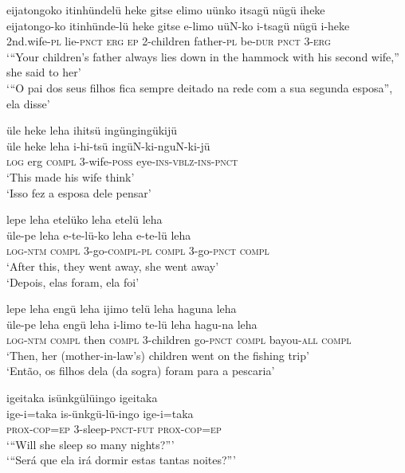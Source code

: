 \documentclass[output=paper,
modfonts,nonflat
]{langsci/langscibook}
\begin{document}
\ea eijatongoko itinhündelü heke gitse elimo uünko itsagü nügü iheke \\[.3em]
\gll eijatongo-ko	itinhünde-lü	heke	gitse	e-limo		uüN-ko i-tsagü	nügü i-heke \\
2nd.wife-\textsc{pl}	lie-\textsc{pnct}	\textsc{erg} 	\textsc{ep} 	2-children 	father-\textsc{pl} be-\textsc{dur} 	\textsc{pnct} 3-\textsc{erg} \\
\glt ‘“Your children’s father always lies down in the hammock with his second wife,” she said to her’ \\
‘“O pai dos seus filhos fica sempre deitado na rede com a sua segunda esposa”, ela disse’\\
\z

\newpage 
\ea üle heke leha  ihitsü ingüngingükijü \\[.3em]
\gll üle	heke	leha	i-hi-tsü	ingüN-ki-nguN-ki-jü \\
\textsc{log} 	{erg}	\textsc{compl}	3-wife-\textsc{poss}	eye-\textsc{ins-vblz-ins-pnct} \\
\glt‘This made his wife think’ \\
‘Isso fez a esposa dele pensar’ \\
\z

\ea lepe leha etelüko leha etelü leha \\[.3em]
\gll üle-pe	leha	e-te-lü-ko	 leha	e-te-lü		leha \\
\textsc{log-ntm}	\textsc{compl}	3-go-\textsc{compl-pl}	\textsc{compl}	3-go-\textsc{pnct}	\textsc{compl} \\
\glt ‘After this, they went away, she went away’ \\
‘Depois, elas foram, ela foi’ \\
\z

\ea lepe leha engü leha ijimo telü leha haguna leha \\[.3em]
\gll üle-pe	leha	engü	leha 	i-limo		 te-lü	leha	hagu-na	leha\\
\textsc{log-ntm}	\textsc{compl}	 then	\textsc{compl}	3-children 	go-\textsc{pnct} 	\textsc{compl}	bayou-\textsc{all} 	\textsc{compl}\\
\glt ‘Then, her (mother-in-law's) children went on the fishing trip’ \\
‘Então, os filhos dela (da sogra) foram para a pescaria’ \\
\z
 
\ea igeitaka isünkgülüingo igeitaka \\[.3em]
\gll ige-i=taka	is-ünkgü-lü-ingo	ige-i=taka \\
\textsc{prox-cop=ep} 	3-sleep-\textsc{pnct-fut}	\textsc{prox-cop=ep} \\
\glt ‘“Will she sleep so many nights?”’{\footnotemark} \\
‘“Será que ela irá dormir estas tantas noites?”’ \\
\z
\end{document}
